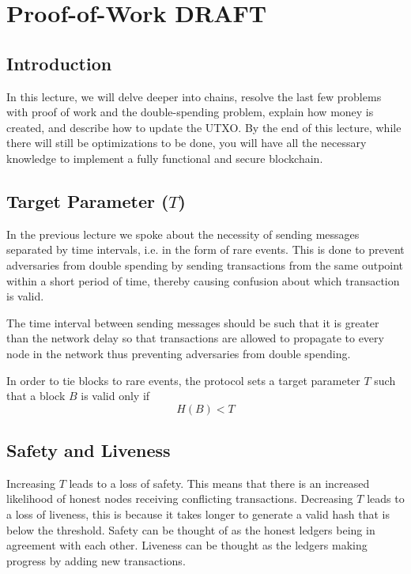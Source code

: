 \chapter{Proof-of-Work \small{\textsf{DRAFT}}}

\section{Introduction}

In this lecture, we will delve deeper into chains, resolve the last few problems with proof of work and the double-spending problem, explain how money is created, and describe how to update the UTXO. By the end of this lecture, while there will still be optimizations to be done, you will have all the necessary knowledge to implement a fully functional and secure blockchain.

\section{Target Parameter ($T$)}

In the previous lecture we spoke about the necessity of sending messages separated by time intervals, i.e. in the form of rare events. This is done to prevent adversaries from double spending by sending transactions from the same outpoint within a short period of time, thereby causing confusion about which transaction is valid.

The time interval between sending messages should be such that it is greater than the network delay so that transactions are allowed to propagate to every node in the network thus preventing adversaries from double spending.

In order to tie blocks to rare events, the protocol sets a target parameter $T$ such that a block $B$ is valid only if
\begin{equation}
    H(B) < T
\end{equation}

\section{Safety and Liveness}

Increasing $T$ leads to a loss of safety. This means that there is an increased likelihood of honest nodes receiving conflicting transactions.
Decreasing $T$ leads to a loss of liveness, this is because it takes longer to generate a valid hash that is below the threshold.
Safety can be thought of as the honest ledgers being in agreement with each other.
Liveness can be thought as the ledgers making progress by adding new transactions.

